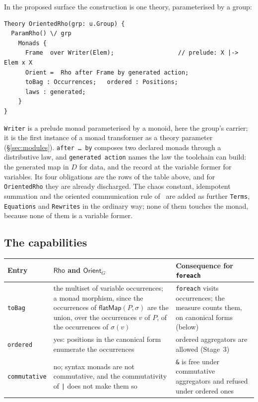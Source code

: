 \documentclass[11pt]{article}
\theoremstyle{branddef}
\theoremstyle{brandplain}
\theoremstyle{brandrem}
\newcommand{\bind}{\mathsf{flatMap}}
\newcommand{\fe}{\texttt{foreach}}
\begin{document}
In the proposed surface the construction is one theory, parameterised by a
group:
\begin{lstlisting}[language=mettail]
Theory OrientedRho(grp: u.Group) {
  ParamRho() \/ grp
    Monads {
      Frame  over Writer(Elem);                  // prelude: X |-> Elem x X
      Orient =  Rho after Frame by generated action;
      toBag : Occurrences;   ordered : Positions;
      laws : generated;
    }
}
\end{lstlisting}
\texttt{Writer} is a prelude monad parameterised by a monoid, here the group's
carrier; it is the first instance of a monad transformer as a theory parameter
(\S\ref{sec:modules}). \texttt{after \dots{} by} composes two declared monads
through a distributive law, and \texttt{generated action} names the law the
toolchain can build: the generated map in \(D\) for data, and the record at the
variable former for variables. Its four obligations are the rows of the table
above, and for \texttt{OrientedRho} they are already discharged. The chaos
constant, idempotent summation and the oriented communication rule
of~\cite{Oriented} are added as further \texttt{Terms}, \texttt{Equations} and
\texttt{Rewrites} in the ordinary way; none of them touches the monad, because
none of them is a variable former.

\subsection{The capabilities}

\begin{center}
\small
\begin{tabular}{@{}L{0.16\textwidth}L{0.36\textwidth}L{0.38\textwidth}@{}}
\toprule
\textbf{Entry} & \(\mathsf{Rho}\) and \(\mathsf{Orient}_G\) &
\textbf{Consequence for \fe{}} \\
\midrule
\texttt{toBag} & the multiset of variable occurrences; a monad morphism, since
the occurrences of \(\bind(P,\sigma)\) are the union, over the occurrences
\(v\) of \(P\), of the occurrences of \(\sigma(v)\) &
\fe{} visits occurrences; the measure counts them, on canonical forms (below) \\[3pt]
\texttt{ordered} & yes: positions in the canonical form enumerate the
occurrences &
ordered aggregators are allowed (Stage~3) \\[3pt]
\texttt{commutative} & no; syntax monads are not commutative, and the
commutativity of \texttt{|} does not make them so &
\texttt{\&} is free under commutative aggregators and refused under ordered
ones \\
\bottomrule
\end{tabular}
\end{center}
\end{document}
